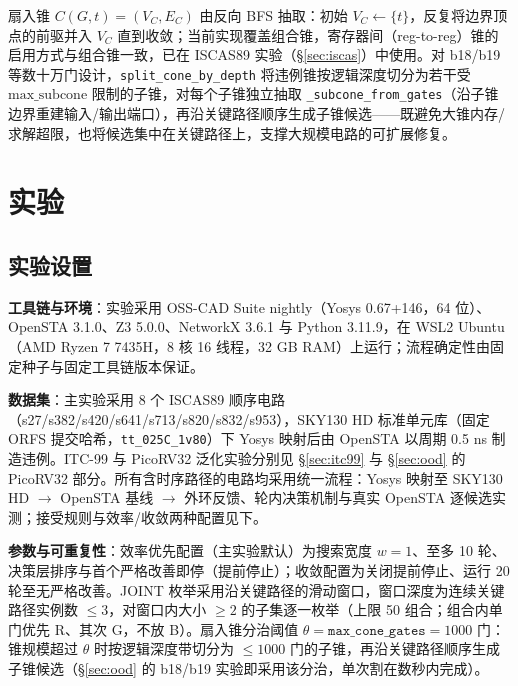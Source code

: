 \documentclass[journal]{IEEEtran}
\begin{document}
扇入锥 $C(G, t) = (V_C, E_C)$ 由反向 BFS 抽取：初始 $V_C \leftarrow \{t\}$，反复将边界顶点的前驱并入 $V_C$ 直到收敛；当前实现覆盖组合锥，寄存器间（reg-to-reg）锥的启用方式与组合锥一致，已在 ISCAS89 实验（\S\ref{sec:iscas}）中使用。对 b18/b19 等数十万门设计，\texttt{split\_cone\_by\_depth} 将违例锥按逻辑深度切分为若干受 $\mathrm{max\_subcone}$ 限制的子锥，对每个子锥独立抽取 \texttt{\_subcone\_from\_gates}（沿子锥边界重建输入/输出端口），再沿关键路径顺序生成子锥候选——既避免大锥内存/求解超限，也将候选集中在关键路径上，支撑大规模电路的可扩展修复。

\section{实验}\label{sec:exp}

\subsection{实验设置}\label{sec:setup}

\textbf{工具链与环境}：实验采用 OSS-CAD Suite nightly（Yosys 0.67+146，64 位）、OpenSTA 3.1.0、Z3 5.0.0、NetworkX 3.6.1 与 Python 3.11.9，在 WSL2 Ubuntu（AMD Ryzen 7 7435H，8 核 16 线程，32 GB RAM）上运行；流程确定性由固定种子与固定工具链版本保证。

\textbf{数据集}：主实验采用 8 个 ISCAS89 顺序电路（s27/s382/s420/s641/s713/s820/s832/s953），SKY130 HD 标准单元库（固定 ORFS 提交哈希，\texttt{tt\_025C\_1v80}）下 Yosys 映射后由 OpenSTA 以周期 0.5 ns 制造违例。ITC-99 与 PicoRV32 泛化实验分别见 \S\ref{sec:itc99} 与 \S\ref{sec:ood} 的 PicoRV32 部分。所有含时序路径的电路均采用统一流程：Yosys 映射至 SKY130 HD $\rightarrow$ OpenSTA 基线 $\rightarrow$ 外环反馈、轮内决策机制与真实 OpenSTA 逐候选实测；接受规则与效率/收敛两种配置见下。

\textbf{参数与可重复性}：效率优先配置（主实验默认）为搜索宽度 $w=1$、至多 10 轮、决策层排序与首个严格改善即停（提前停止）；收敛配置为关闭提前停止、运行 20 轮至无严格改善。JOINT 枚举采用沿关键路径的滑动窗口，窗口深度为连续关键路径实例数 $\le 3$，对窗口内大小 $\ge 2$ 的子集逐一枚举（上限 50 组合；组合内单门优先 R、其次 G，不放 B）。扇入锥分治阈值 $\theta = \texttt{max\_cone\_gates} = 1000$ 门：锥规模超过 $\theta$ 时按逻辑深度带切分为 $\le 1000$ 门的子锥，再沿关键路径顺序生成子锥候选（\S\ref{sec:ood} 的 b18/b19 实验即采用该分治，单次割在数秒内完成）。
\end{document}
